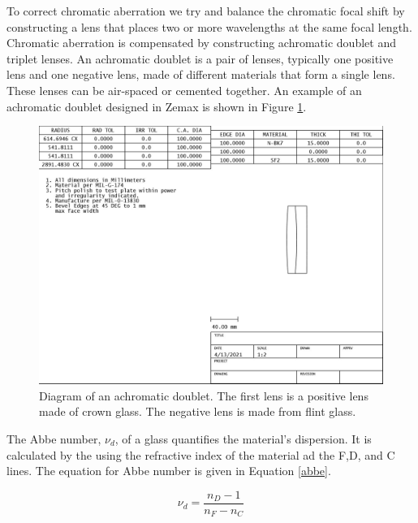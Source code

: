 To correct chromatic aberration we try and balance the chromatic focal shift by constructing a lens that places two or more wavelengths at the same focal length. Chromatic aberration is compensated by constructing achromatic doublet and triplet lenses. An achromatic doublet is a pair of lenses, typically one positive lens and one negative lens, made of different materials that form a single lens. These lenses can be air-spaced or cemented together. An example of an achromatic doublet designed in Zemax is shown in Figure \ref{fig:crownflint}.

\begin{figure}
    \centering
    \includegraphics[width=.8\textwidth]{Chapter Materials/Chapter Three Materials/doublet.jpg}
    \caption{Diagram of an achromatic doublet. The first lens is a positive lens made of crown glass. The negative lens is made from flint glass. }
    \label{fig:crownflint}
\end{figure}

The Abbe number, $\nu_d$, of a glass quantifies the material's dispersion. It is calculated by the using the refractive index of the material ad the F,D, and C lines. The equation for Abbe number is given in Equation \ref{abbe}. 

\begin{equation}
    \nu_d=\frac{n_D-1}{n_F-n_C}
    \label{abbe}
\end{equation}

